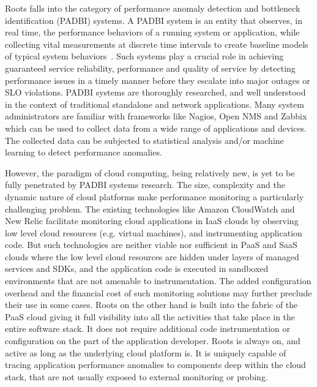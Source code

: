 Roots falls into the category of performance anomaly detection and bottleneck identification (PADBI) systems.
A PADBI system is an entity that observes, in real time, the performance behaviors
of a running system or application, while collecting vital measurements at discrete time intervals to create baseline
models of typical system behaviors~\cite{Ibidunmoye:2015:PAD:2808687.2791120}. 
Such systems play a crucial role in achieving guaranteed service reliability, performance and
quality of service by detecting performance issues in a timely manner before they escalate into major outages
or SLO violations. PADBI systems are thoroughly researched, and well understood in the context of traditional standalone and
network applications. Many system administrators are familiar with frameworks like Nagios, Open NMS and Zabbix which
can be used to collect data from a wide range of applications and devices. The collected data can be
subjected to statistical analysis and/or machine learning to detect performance anomalies. 

However, the paradigm of cloud computing, being relatively new, is yet to be
fully penetrated by PADBI systems research. The size, complexity and the dynamic nature of 
cloud platforms make performance monitoring a particularly challenging problem.
The existing technologies like Amazon CloudWatch
and New Relic facilitate monitoring cloud applications in IaaS clouds by observing low level
cloud resources (e.g. virtual machines), and instrumenting application code. But such technologies
are neither viable nor sufficient in
PaaS and SaaS clouds where the low level cloud resources are hidden under layers of managed
services and SDKs, and the application code is executed in sandboxed environments that are not
amenable to instrumentation. The added configuration overhead and the financial cost of such monitoring
solutions may further preclude their use in some cases. Roots on the other hand is built into the 
fabric of the PaaS cloud giving it full visibility into all the activities that take place in the entire
software stack. It does not require additional
code instrumentation or configuration on the part of the application developer. Roots is always on,
and active as long as the underlying cloud platform is. It is uniquely capable of tracing application 
performance anomalies to components deep within the cloud stack, that are not 
usually exposed to external monitoring or probing.

